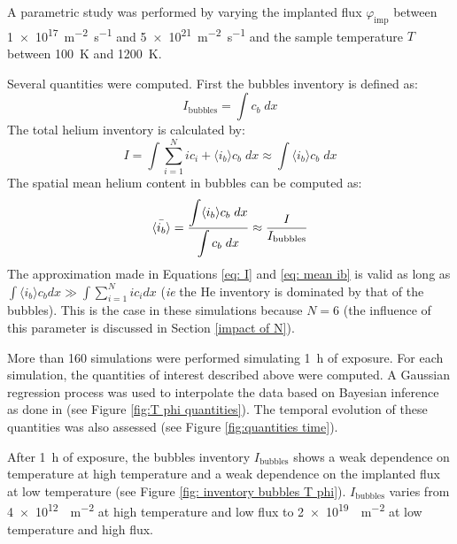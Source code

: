 A parametric study was performed by varying the implanted flux $\varphi_\mathrm{imp}$ between \SI{1e17}{m^{-2} s^{-1}} and \SI{5e21}{m^{-2} s^{-1}} and the sample temperature $T$ between \SI{100}{K} and \SI{1200}{K}.

Several quantities were computed.
First the bubbles inventory is defined as:
\begin{equation}
    I_\mathrm{bubbles}= \displaystyle \int c_b \; dx
\end{equation}
The total helium inventory is calculated by:
\begin{equation}
        I = \displaystyle \int \sum\limits_{i=1}^N i c_i + \langle i_b \rangle c_b \; dx
        \approx \displaystyle \int \langle i_b \rangle c_b \; dx
    \label{eq: I}
\end{equation}
The spatial mean helium content in bubbles can be computed as:
\begin{equation}
        \Bar{\langle i_b \rangle} = \frac{\displaystyle \int \langle i_b \rangle c_b \; dx}{\displaystyle \int c_b \; dx}
        \approx \frac{I}{I_\mathrm{bubbles}}
    \label{eq: mean ib}
\end{equation}
The approximation made in Equations \ref{eq: I} and \ref{eq: mean ib} is valid as long as $\int \langle i_b \rangle c_b dx \gg  \int \sum\limits_{i=1}^N i c_i dx$ (\textit{ie} the He inventory is dominated by that of the bubbles).
This is the case in these simulations because $N=6$ (the influence of this parameter is discussed in Section \ref{impact of N}).

More than 160 simulations were performed simulating \SI{1}{h} of exposure.
For each simulation, the quantities of interest described above were computed.
A Gaussian regression process  was used to interpolate the data based on Bayesian inference as done in  (see Figure \ref{fig:T phi quantities}).
The temporal evolution of these quantities was also assessed (see Figure \ref{fig:quantities time}).

After \SI{1}{h} of exposure, the bubbles inventory $I_\mathrm{bubbles}$ shows a weak dependence on temperature at high temperature and a weak dependence on the implanted flux at low temperature (see Figure \ref{fig: inventory bubbles T phi}).
$I_\mathrm{bubbles}$ varies from \SI{4e12}{ m^{-2}} at high temperature and low flux to \SI{2e19}{ m^{-2}} at low temperature and high flux.


